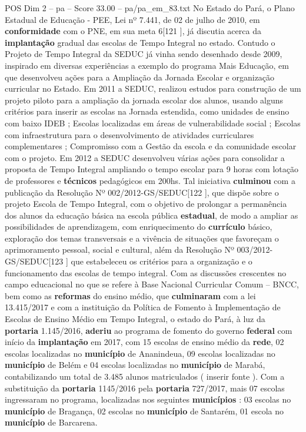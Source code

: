 \begin{textsample}{POS Dim 2 – pa – Score 33.00 – pa/pa\_em\_83.txt}
No Estado do Pará, o Plano Estadual de Educação - PEE, Lei nº 7.441, de 02 de julho de 2010, em \textbf{conformidade} com o PNE, em sua meta 6[121 ], já discutia acerca da \textbf{implantação} gradual das escolas de Tempo Integral no estado.
Contudo o Projeto de Tempo Integral da SEDUC já vinha sendo desenhado desde 2009, inspirado em diversas experiências a exemplo do programa Mais Educação, em que desenvolveu ações para a Ampliação da Jornada Escolar e organização curricular no Estado.
Em 2011 a SEDUC, realizou estudos para construção de um projeto piloto para a ampliação da jornada escolar dos alunos, usando alguns critérios para inserir as escolas na Jornada estendida, como unidades de ensino com baixo IDEB ; Escolas localizadas em áreas de vulnerabilidade social ; Escolas com infraestrutura para o desenvolvimento de atividades curriculares complementares ; Compromisso com a Gestão da escola e da comunidade escolar com o projeto.
Em 2012 a SEDUC desenvolveu várias ações para consolidar a proposta de Tempo Integral ampliando o tempo escolar para 9 horas com lotação de professores e \textbf{técnicos} pedagógicos em 200hs.
Tal iniciativa \textbf{culminou} com a publicação da Resolução Nº 002/2012-GS/SEDUC[122 ], que dispõe sobre o projeto Escola de Tempo Integral, com o objetivo de prolongar a permanência dos alunos da educação básica na escola pública \textbf{estadual}, de modo a ampliar as possibilidades de aprendizagem, com enriquecimento do \textbf{currículo} básico, exploração dos temas transversais e a vivência de situações que favoreçam o aprimoramento pessoal, social e cultural, além da Resolução Nº 003/2012-GS/SEDUC[123 ] que estabeleceu os critérios para a organização e o funcionamento das escolas de tempo integral.
Com as discussões crescentes no campo educacional no que se refere à Base Nacional Curricular Comum – BNCC, bem como as \textbf{reformas} do ensino médio, que \textbf{culminaram} com a lei 13.415/2017 e com a instituição da Política de Fomento à Implementação de Escolas de Ensino Médio em Tempo Integral, o estado do Pará, à luz da \textbf{portaria} 1.145/2016, \textbf{aderiu} ao programa de fomento do governo \textbf{federal} com início da \textbf{implantação} em 2017, com 15 escolas de ensino médio da \textbf{rede}, 02 escolas localizadas no \textbf{município} de Ananindeua, 09 escolas localizadas no \textbf{município} de Belém e 04 escolas localizadas no \textbf{município} de Marabá, contabilizando um total de 3.485 alunos matriculados ( inserir fonte ).
Com a substituição da \textbf{portaria} 1145/2016 pela \textbf{portaria} 727/2017, mais 07 escolas ingressaram no programa, localizadas nos seguintes \textbf{municípios} : 03 escolas no \textbf{município} de Bragança, 02 escolas no \textbf{município} de Santarém, 01 escola no \textbf{município} de Barcarena.

\end{textsample}

